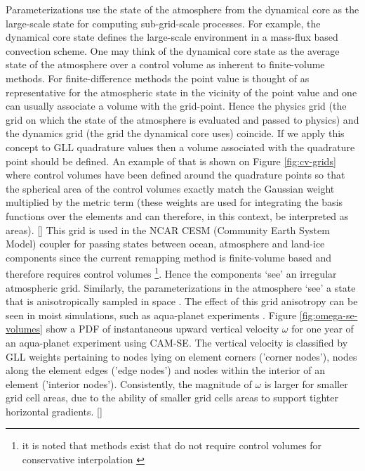 \documentclass[twocol]{ametsoc}
\begin{document}
Parameterizations use the state of the atmosphere from the dynamical core as the large-scale state for computing sub-grid-scale processes. For example, the dynamical core state defines the large-scale environment in a mass-flux based convection scheme. One may think of the dynamical core state as the average state of the atmosphere over a control volume as inherent to finite-volume methods. For finite-difference methods the point value is thought of as representative for the atmospheric state in the vicinity of the point value and one can usually associate a volume with the grid-point. Hence the physics grid (the grid on which the state of the atmosphere is evaluated and passed to physics) and the dynamics grid (the grid the dynamical core uses) coincide. If we apply this concept to GLL quadrature values then a volume associated with the quadrature point should be defined. An example of that is shown on Figure \ref{fig:cv-grids} where control volumes have been defined around the quadrature points so that the spherical area of the control volumes exactly match the Gaussian weight multiplied by the metric term (these weights are used for integrating the basis functions over the elements and can therefore, in this context, be interpreted as areas). [{\color{red}{Mark: could we be mathematically more rigorous? perhaps an appendix describing the iterative algorithm?}}] This grid is used in the NCAR CESM (Community Earth System Model) coupler for passing states between ocean, atmosphere and land-ice components since the current remapping method is finite-volume based and therefore requires control volumes {\footnote{it is noted that methods exist that do not require control volumes for conservative interpolation \citep{UT2015MWR}}}. Hence the components `see' an irregular atmospheric grid. Similarly, the parameterizations in the atmosphere `see' a state that is anisotropically sampled in space \citep[see Figure 1 and 5 in ][]{KetAl2008JGR}. The effect of this grid anisotropy can be seen in moist simulations, such as aqua-planet experiments \citep{MWO2016JAMES,MWO2016JAMES}. Figure \ref{fig:omega-se-volumes} show a PDF of instantaneous upward vertical velocity $\omega$ for one year of an aqua-planet experiment using CAM-SE. The vertical velocity is classified by GLL weights pertaining to nodes lying on element corners ('corner nodes'), nodes along the element edges ('edge nodes') and nodes within the interior of an element ('interior nodes'). Consistently, the magnitude of $\omega$ is larger for smaller grid cell areas, due to the ability of smaller grid cells areas to support tighter horizontal gradients. [{\color{red}{The question is then how will the physics respond to this?}}]
\end{document}
